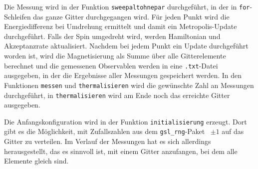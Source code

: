 	Die Messung wird in der Funktion \texttt{sweepaltohnepar} durchgeführt, in der in \texttt{for}-Schleifen das ganze Gitter durchgegangen wird. Für jeden Punkt wird die Energiedifferenz bei Umdrehung ermittelt und damit ein Metropolis-Update durchgeführt. Falls der Spin umgedreht wird, werden Hamiltonian und Akzeptanzrate aktualisiert. Nachdem bei jedem Punkt ein Update durchgeführt worden ist, wird die Magnetisierung als Summe über alle Gitterelemente berechnet und die gemessenen Observablen werden in eine \texttt{.txt}-Datei ausgegeben, in der die Ergebnisse aller Messungen gespeichert werden.
	In den Funktionen \texttt{messen} und \texttt{thermalisieren} wird die gewünschte Zahl an Messungen durchgeführt, in \texttt{thermalisieren} wird am Ende noch das erreichte Gitter ausgegeben.
	
	
	Die Anfangskonfiguration wird in der Funktion \texttt{initialisierung} erzeugt. Dort gibt es die Möglichkeit, mit Zufallszahlen aus dem \texttt{gsl\_rng}-Paket~\cite{gsldoc} $\pm 1$ auf das Gitter zu verteilen. Im Verlauf der Messungen hat es sich allerdings herausgestellt, das es sinnvoll ist, mit einem Gitter anzufangen, bei dem alle Elemente gleich sind. 
	
